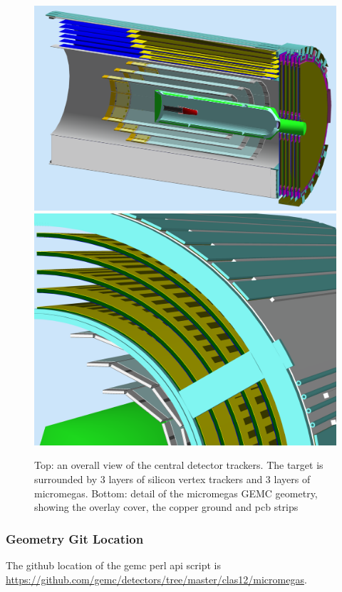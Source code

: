\begin{figure}
	\centering
	\includegraphics[width=0.95\columnwidth,keepaspectratio]{img/bmtGeometry.png}
	\includegraphics[width=0.95\columnwidth,keepaspectratio]{img/bmtDetail.png}
	\caption{Top: an overall view of the central detector trackers. The target is surrounded by 3 layers of silicon vertex trackers and
            3 layers of micromegas. Bottom: detail of the micromegas GEMC geometry, showing the overlay cover, the copper ground and pcb strips}
	\label{fig:bmtGeometry}
\end{figure}



\subsubsection{Geometry Git Location}
The github location of the gemc perl api script is \url{https://github.com/gemc/detectors/tree/master/clas12/micromegas}.


